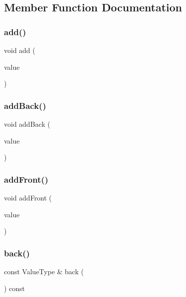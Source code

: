 \subsection{Member Function Documentation}
\mbox{\label{classDeque_ab901606bf3a8019c986f0cf9a9f298dc}} 
\subsubsection{\texorpdfstring{add()}{add()}}
{\footnotesize\ttfamily void add (\begin{DoxyParamCaption}\item[{const Value\+Type \&}]{value }\end{DoxyParamCaption})}

\mbox{\label{classDeque_a0c733f31bccadf80a6793490b115bd37}} 
\subsubsection{\texorpdfstring{add\+Back()}{addBack()}}
{\footnotesize\ttfamily void add\+Back (\begin{DoxyParamCaption}\item[{const Value\+Type \&}]{value }\end{DoxyParamCaption})}

\mbox{\label{classDeque_a1d5c5f74583e2a0fcd33f177ecbb9aa4}} 
\subsubsection{\texorpdfstring{add\+Front()}{addFront()}}
{\footnotesize\ttfamily void add\+Front (\begin{DoxyParamCaption}\item[{const Value\+Type \&}]{value }\end{DoxyParamCaption})}

\mbox{\label{classDeque_adc761c91bdacd01bed5c96e25fd9486a}} 
\subsubsection{\texorpdfstring{back()}{back()}}
{\footnotesize\ttfamily const Value\+Type \& back (\begin{DoxyParamCaption}{ }\end{DoxyParamCaption}) const}

